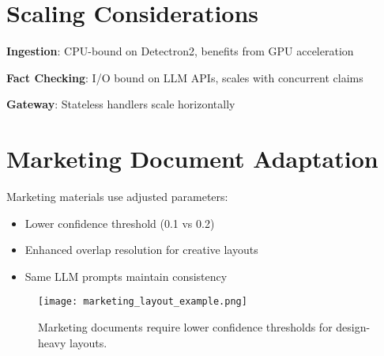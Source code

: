 \documentclass[11pt]{article}
\begin{document}
\section{Scaling Considerations}

\textbf{Ingestion}: CPU-bound on Detectron2, benefits from GPU acceleration

\textbf{Fact Checking}: I/O bound on LLM APIs, scales with concurrent claims

\textbf{Gateway}: Stateless handlers scale horizontally

\section{Marketing Document Adaptation}

Marketing materials use adjusted parameters:
\begin{itemize}
\item Lower confidence threshold (0.1 vs 0.2)
\item Enhanced overlap resolution for creative layouts
\item Same LLM prompts maintain consistency
\end{itemize}

\begin{figure}[H]
\centering
\texttt{[image: marketing\_layout\_example.png]}
\caption{Marketing documents require lower confidence thresholds for design-heavy layouts.}
\end{figure}
\end{document}
